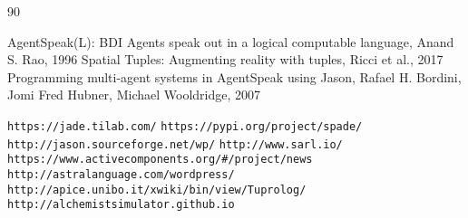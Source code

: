 \documentclass[12pt,a4paper,openright,twoside]{report}
\theoremstyle{plain}
\theoremstyle{definition}
\begin{document}

\makeatletter
\renewcommand\@bibitem[1]
{
  \item\if@filesw \immediate\write\@auxout
  {\string\bibcite{#1}{Bib. \the\value{\@listctr}}}\fi\ignorespaces
}%
\def\@biblabel#1{[Bib. #1]}%
\makeatother

\begin{thebibliography}{90} %
\rhead[\fancyplain{}{\bfseries \leftmark}]{\fancyplain{}{\bfseries \thepage}}


 AgentSpeak(L): BDI Agents speak out in a logical computable language, Anand S. Rao, 1996
 Spatial Tuples: Augmenting reality with tuples, Ricci et al., 2017
 Programming multi-agent systems in AgentSpeak using Jason, Rafael H. Bordini, Jomi Fred Hubner, Michael Wooldridge, 2007

\end{thebibliography}


\makeatletter
\let\@orig@endthebibliography\endthebibliography
\renewcommand\endthebibliography
{
  \xdef\@kept@last@number{\the\c@enumiv}%
  \@orig@endthebibliography
}

\newenvironment{thesitography}[1]
{\def\bibname{Sitografia}%
   \thebibliography{#1}%
}
{\@orig@endthebibliography}

\renewcommand\@bibitem[1]
{
  \item\if@filesw \immediate\write\@auxout
  {\string\bibcite{#1}{Sit. \the\value{\@listctr}}}\fi\ignorespaces
}%
\def\@biblabel#1{[Sit. #1]}%
\makeatother

{\fancyplain{}{\bfseries\thepage}}
\begin{thesitography}{90} %
\rhead[\fancyplain{}{\bfseries \leftmark}]{\fancyplain{}{\bfseries \thepage}}


 \texttt{https://jade.tilab.com/}
 \texttt{https://pypi.org/project/spade/}
 \texttt{http://jason.sourceforge.net/wp/}
 \texttt{http://www.sarl.io/}
 \texttt{https://www.activecomponents.org/\#/project/news}
 \texttt{http://astralanguage.com/wordpress/}
 \texttt{http://apice.unibo.it/xwiki/bin/view/Tuprolog/}
 \texttt{http://alchemistsimulator.github.io}
\end{thesitography}

\end{document}
